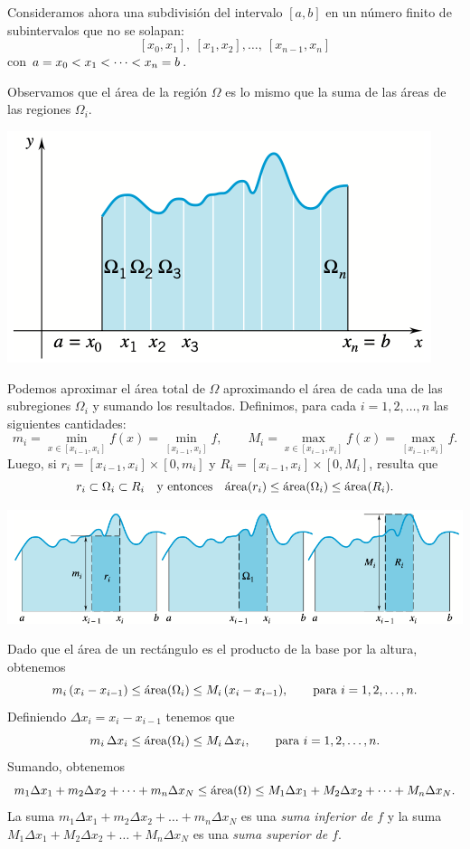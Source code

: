 \noindent
\begin{minipage}{.5\textwidth}
  Consideramos ahora una subdivisión del intervalo $[a,b]$ en un número finito de subintervalos que no se solapan:
  \[
  [x_0,x_1],\ [x_1,x_2],\dots,\ [x_{n-1},x_n]
  \]
  con $\displaystyle a=x_0<x_1<\dots<x_n=b$.

  Observamos que el área de la región $\Omega$ es lo mismo que la suma de las áreas de las regiones $\Omega_i$.
\end{minipage}
\begin{minipage}{.5\textwidth}
  \centering
  \includegraphics[width=.9\textwidth]{pics/area-bajo-curva-particionada.png}
\end{minipage}

Podemos aproximar el área total de $\Omega$ aproximando el área de cada una de las subregiones $\Omega_i$ y sumando los resultados.
Definimos, para cada $i=1,2,\dots,n$ las siguientes cantidades:
\[ 
  m_i = \min_{x\in [x_{i-1},x_i]}f(x)=\min_{[x_{i-1},x_i]}f,
  \qquad
  M_i = \max_{x\in [x_{i-1},x_i]}f(x)=\max_{[x_{i-1},x_i]}f.
\]
Luego, si $r_i = [x_{i-1},x_i]\times [0,m_i]$ y $R_i = [x_{i-1},x_i]\times [0,M_i]$, resulta que
\[
r_i \subset \Omega_i \subset R_i
\quad\text{y entonces}\quad
\mathrm{\protect\acute{a}rea}(r_i)\le \mathrm{\protect\acute{a}rea}(\Omega_i) \le \mathrm{\protect\acute{a}rea}(R_i).
\]

\centerline{
  \includegraphics[width=.9\textwidth]{pics/area-omega-i.png}
}

Dado que el área de un rectángulo es el producto de la base por la altura, obtenemos
\[
m_i\, (x_i-x_{i-1})
\le \mathrm{\protect\acute{a}rea}(\Omega_i) \le
M_i\, (x_i-x_{i-1}),
\qquad\text{para $i=1,2,\dots,n$}.
\]
Definiendo $\Delta x_i=x_i-x_{i-1}$ tenemos que 
\[
m_i\, \Delta x_i
\le \mathrm{\protect\acute{a}rea}(\Omega_i) \le
M_i\, \Delta x_i,
\qquad\text{para $i=1,2,\dots,n$}.
\]
Sumando, obtenemos
\begin{equation}
  \label{eq:L<I<U}
m_1 \Delta x_1 + m_2 \Delta x_2 + \dots + m_n \Delta x_N
\le \mathrm{\protect\acute{a}rea}(\Omega) \le
M_1 \Delta x_1 + M_2 \Delta x_2 + \dots + M_n \Delta x_N.
\end{equation}
La suma $m_1 \Delta x_1 + m_2 \Delta x_2 + \dots + m_n \Delta x_N$ es una \emph{suma inferior de $f$} 
y la suma $M_1 \Delta x_1 + M_2 \Delta x_2 + \dots + M_n \Delta x_N$ es una \emph{suma superior de $f$}.

